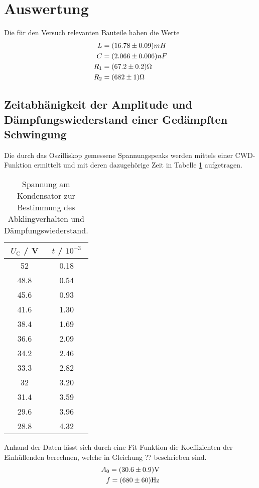 \section{Auswertung}
\label{sec:Auswertung}
Die für den Versuch relevanten Bauteile haben die Werte
\begin{eqnarray}
  L 	&= (\num{16.78 +- 0.09}) mH	\\
  C 	&= (\num{2.066 +- 0.006}) nF	\\
R_1 	&= (\num{67.2 +- 0.2}) \Omega	\\
R_2 	&= (\num{682 +- 1}) \Omega
  \label{eqn:Bau}
\end{eqnarray}

\subsection{Zeitabhänigkeit der Amplitude und Dämpfungswiederstand einer Gedämpften Schwingung}
Die durch das Oszilliskop gemessene Spannungspeaks werden mittels einer CWD-Funktion ermittelt und mit deren dazugehörige Zeit in Tabelle \ref{tab:U_C} aufgetragen.
\begin{table}
  \centering
  \begin{tabular}{c c}
    \toprule
    	$U_\text{C}$ / V & $t$ / $10^{-3}$ \\
    \midrule
	52	& 0.18	\\
	48.8	& 0.54	\\
	45.6	& 0.93 	\\
	41.6	& 1.30	\\
	38.4	& 1.69	\\
	36.6	& 2.09 	\\
	34.2	& 2.46	\\
	33.3 	& 2.82	\\
	32	& 3.20 	\\
	31.4	& 3.59	\\
	29.6	& 3.96	\\
	28.8	& 4.32 	\\
    \bottomrule
  \end{tabular}
  \caption{Spannung am Kondensator zur Bestimmung des Abklingverhalten und Dämpfungswiederstand.}
  \label{tab:U_C}
\end{table}
Anhand der Daten lässt sich durch eine Fit-Funktion die Koeffizienten der Einhüllenden berechnen, welche in Gleichung ?? beschrieben sind. 
\begin{eqnarray}
  A_0 = ( \num{30.6 +- 0.9} ) \text{V} \\
  f = ( \num{680 +- 60} ) \text{Hz}
  \label{eqn:Koef}
\end{eqnarray}
